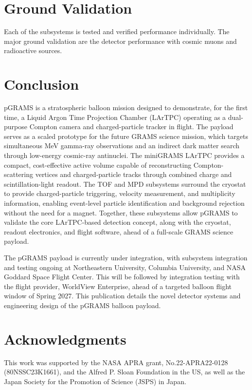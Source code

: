 \documentclass[a4paper,fleqn,longmktitle]{cas-dc}
\begin{document}

\section{Ground Validation}\label{chap:data}
Each of the subsystems is tested and verified performance individually. The major ground validation are the detector performance with cosmic muons and radioactive sources.

\section{Conclusion}\label{chap:conclusion}
pGRAMS is a stratospheric balloon mission designed to demonstrate, for the first time, a Liquid Argon Time Projection Chamber (LArTPC) operating as a dual-purpose Compton camera and charged-particle tracker in flight. The payload serves as a scaled prototype for the future GRAMS science mission, which targets simultaneous MeV gamma-ray observations and an indirect dark matter search through low-energy cosmic-ray antinuclei. The miniGRAMS LArTPC provides a compact, cost-effective active volume capable of reconstructing Compton-scattering vertices and charged-particle tracks through combined charge and scintillation-light readout. The TOF and MPD subsystems surround the cryostat to provide charged-particle triggering, velocity measurement, and multiplicity information, enabling event-level particle identification and background rejection without the need for a magnet. Together, these subsystems allow pGRAMS to validate the core LArTPC-based detection concept, along with the cryostat, readout electronics, and flight software, ahead of a full-scale GRAMS science payload.

The pGRAMS payload is currently under integration, with subsystem integration and testing ongoing at Northeastern University, Columbia University, and NASA Goddard Space Flight Center. This will be followed by integration testing with the flight provider, WorldView Enterprise, ahead of a targeted balloon flight window of Spring 2027. This publication details the novel detector systems and engineering design of the pGRAMS balloon payload.

\section{Acknowledgments}\label{Acknowledgments}
This work was supported by the NASA APRA grant, No.22-APRA22-0128 (80NSSC23K1661), and the Alfred P. Sloan Foundation in the US, as well as the Japan Society for the Promotion of Science (JSPS) in Japan. 
\end{document}
